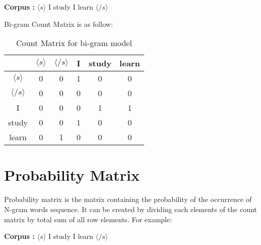 \textbf{Corpus : } $\langle s \rangle$ I study I learn $\langle /s \rangle$

Bi-gram Count Matrix is as follow:

\begin{table}[h]
	\centering
	\begin{tabular}{|c| c| c| c| c| c|}
		\hline
		                     & $\langle s \rangle$ & $\langle /s \rangle$ & I & study & learn \\
		\hline
		$\langle s \rangle$  & 0                   & 0                    & 1 & 0     & 0     \\
		\hline
		$\langle /s \rangle$ & 0                   & 0                    & 0 & 0     & 0     \\
		\hline
		I                    & 0                   & 0                    & 0 & 1     & 1     \\
		\hline
		study                & 0                   & 0                    & 1 & 0     & 0     \\
		\hline
		learn                & 0                   & 1                    & 0 & 0     & 0     \\
		\hline
	\end{tabular}
	\caption{Count Matrix for bi-gram model}
	\label{tab:cmbi2}
\end{table}

\section{Probability Matrix}
Probability matrix is the matrix containing the probability of the occurrence of N-gram words sequence. It can be created by dividing each elements of the count matrix by total sum of all row elements. For example:

\textbf{Corpus : } $\langle s \rangle$ I study I learn $\langle /s \rangle$

